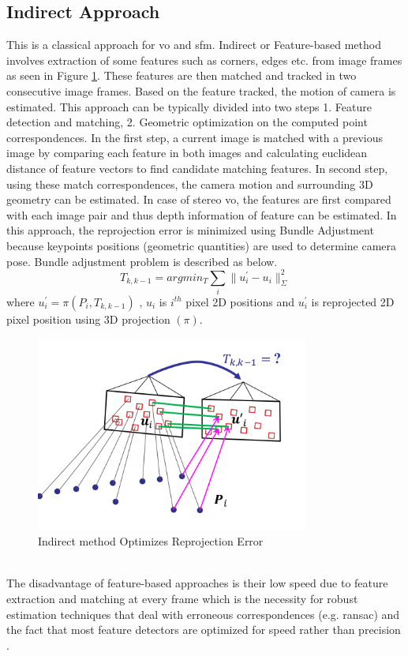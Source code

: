 \subsection{Indirect Approach}
This is a classical approach for \acrshort{vo} and \acrshort{sfm}. Indirect or Feature-based method involves extraction of some features such as corners, edges etc. from image frames as seen in Figure \ref{fig:feature}. These features are then matched and tracked in two consecutive image frames. Based on the feature tracked, the motion of camera is estimated. This approach can be typically divided into two steps 1. Feature detection and matching, 2. Geometric optimization on the computed point correspondences. In the first step, a current image is matched with a previous image by comparing each feature in both images and calculating euclidean distance of feature vectors to find candidate matching features\cite{Aqel-et-al-2016}. In second step, using these match correspondences, the camera motion and surrounding 3D geometry can be estimated. In case of stereo \acrshort{vo}, the features are first compared with each image pair and thus depth information of feature can be estimated. In this approach, the reprojection error is minimized using Bundle Adjustment because keypoints positions (geometric quantities) are used to determine camera pose. Bundle adjustment problem is described as below. 
\begin{equation*}
	T_{k,k-1} = arg min_{T} \sum_{i} \| u^{'}_{i}- u_{i}\|^{2}_{\Sigma}
\end{equation*}
where   $u^{'}_{i} = \pi (P_{i},T_{k,k-1})$ , $ u_{i} $ is $ i^{th} $  pixel 2D positions and $ u^{'}_{i} $ is reprojected 2D pixel position using 3D projection $(\pi)$.  
\newline
\begin{figure}[h]
	\centering
	\includegraphics[width=0.8\textwidth]{indirect}
	\caption{Indirect method Optimizes Reprojection Error \cite{lecture}}
	\label{fig:feature}
\end{figure}
\\
The disadvantage of feature-based approaches is their low speed due to feature extraction and matching at every frame which is the necessity for robust estimation techniques that deal with erroneous correspondences (e.g. \acrshort{ransac}) and the fact that most feature detectors are optimized for speed rather than precision \cite{7782863}.

